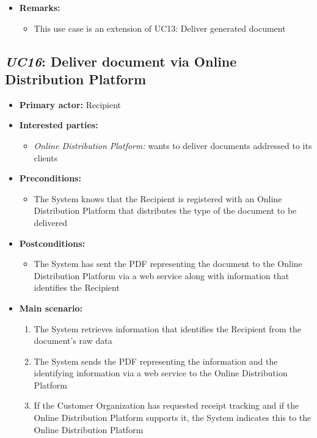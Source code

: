 \documentclass[a4paper,10pt]{article}
\begin{document}
\begin{itemize}
    \item \textbf{Remarks:}
        \begin{itemize}
            \item This use case is an extension of UC13: Deliver generated document
        \end{itemize}
\end{itemize}

\subsection{\emph{UC16}: Deliver document via Online Distribution Platform}
\begin{itemize}
    \item \textbf{Primary actor:} Recipient
    \item \textbf{Interested parties:} 
        \begin{itemize}
            \item \textit{Online Distribution Platform:} wants to deliver documents addressed to its clients
        \end{itemize}

    \item \textbf{Preconditions:}
        \begin{itemize}
            \item The System knows that the Recipient is registered with an Online Distribution Platform that distributes the type of the document to be delivered
        \end{itemize}

    \item \textbf{Postconditions:}
        \begin{itemize}
            \item The System has sent the PDF representing the document to the Online Distribution Platform via a web service along with information
            that identifies the Recipient
        \end{itemize}
        
    \item \textbf{Main scenario:} 
    \begin{enumerate}
       \item The System retrieves information that identifies the Recipient from the document's raw data
       \item The System sends the PDF representing the information and the identifying information via a web service to the Online Distribution Platform
       \item If the Customer Organization has requested receipt tracking and if the Online Distribution Platform supports it, the System indicates this to the Online Distribution Platform
    \end{enumerate}


\end{itemize}
\end{document}
